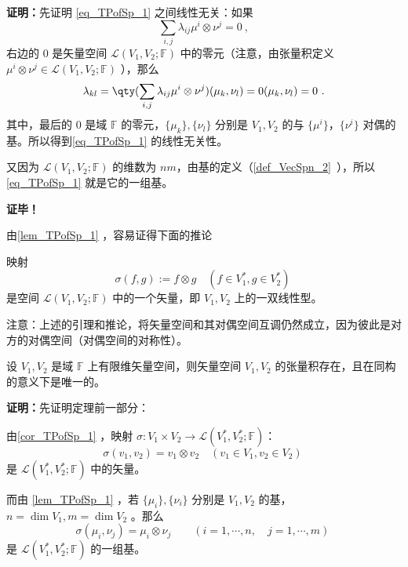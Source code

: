 \textbf{证明：}先证明 \autoref{eq_TPofSp_1} 之间线性无关：如果
\begin{equation}
\sum_{i,j}\lambda_{ij}\mu^i\otimes\nu^j=0~,
\end{equation}
右边的 $0$ 是矢量空间 $\mathcal L(V_1,V_2;\mathbb F)$
中的零元（注意，由张量积定义 $\mu^i\otimes\nu^j\in \mathcal L(V_1,V_2;\mathbb F)$ ），那么
\begin{equation}
\lambda_{kl}=\qty(\sum_{i,j}\lambda_{ij}\mu^i\otimes\nu^j)(\mu_k,\nu_l)=0(\mu_k,\nu_l)=0~.
\end{equation}
其中，最后的 $0$ 是域 $\mathbb F$ 的零元，$\{\mu_k\},\{\nu_l\}$ 分别是 $V_1,V_2$ 的与 $\{\mu^i\}$，$\{\nu^i\}$ 对偶的基。所以得到\autoref{eq_TPofSp_1} 的线性无关性。

又因为 $\mathcal L(V_1,V_2;\mathbb F)$ 的维数为 $nm$，由基的定义（\autoref{def_VecSpn_2}~），所以\autoref{eq_TPofSp_1} 就是它的一组基。

\textbf{证毕！}

由\autoref{lem_TPofSp_1} ，容易证得下面的推论
\begin{corollary}{}\label{cor_TPofSp_1}
映射
\begin{equation}
\sigma(f,g):=f\otimes g\quad( f\in V_1^*,g\in V_2^*)~
\end{equation}
是空间 $\mathcal L(V_1,V_2;\mathbb F)$ 中的一个矢量，即 $V_1,V_2$ 上的一双线性型。
\end{corollary}
注意：上述的引理和推论，将矢量空间和其对偶空间互调仍然成立，因为彼此是对方的对偶空间（对偶空间的对称性）。

\begin{theorem}{}\label{the_TPofSp_1}
设 $V_1,V_2$ 是域 $\mathbb F$ 上有限维矢量空间，则矢量空间 $V_1,V_2$ 的张量积存在，且在同构的意义下是唯一的。
\end{theorem}
\textbf{证明：}先证明定理前一部分：

由\autoref{cor_TPofSp_1} ，映射 $\sigma:V_1\times V_2\rightarrow\mathcal L(V_1^*,V_2^*;\mathbb F) $：
\begin{equation}\label{eq_TPofSp_7}
\sigma(v_1,v_2)=v_1\otimes v_2 \quad (v_1\in V_1,v_2\in V_2 )~
\end{equation}
是  $\mathcal L(V_1^*,V_2^*;\mathbb F)$ 中的矢量。

而由 \autoref{lem_TPofSp_1} ，若 $\{\mu_i\},\{\nu_i\}$ 分别是 $V_1,V_2$ 的基，$n=\dim V_1,m=\dim V_2$ 。那么
\begin{equation}\label{eq_TPofSp_2}
\sigma(\mu_i,\nu_j)=\mu_i\otimes \nu_j\qquad (i=1,\cdots,n,\quad j=1,\cdots,m)~
\end{equation}
是 $\mathcal L(V_1^*,V_2^*;\mathbb F)$ 的一组基。

